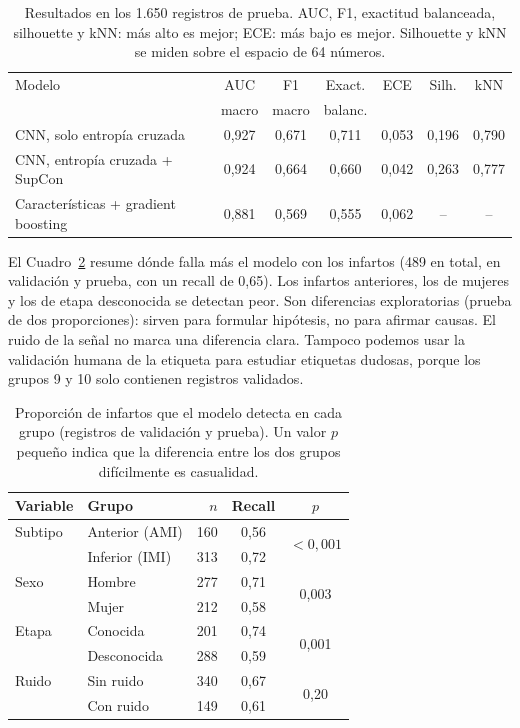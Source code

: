 \documentclass[conference]{IEEEtran}
\begin{document}
\begin{table}[t]
\centering
\caption{Resultados en los 1.650 registros de prueba. AUC, F1, exactitud balanceada, silhouette y kNN: más alto es mejor; ECE: más bajo es mejor. Silhouette y kNN se miden sobre el espacio de 64 números.}
\label{tab:resultados}
\scriptsize
\setlength{\tabcolsep}{3pt}
\begin{tabular}{lcccccc}
\toprule
Modelo & AUC & F1 & Exact. & ECE & Silh. & kNN \\
 & macro & macro & balanc. & & & \\
\midrule
CNN, solo entropía cruzada & 0,927 & 0,671 & 0,711 & 0,053 & 0,196 & 0,790 \\
CNN, entropía cruzada + SupCon & 0,924 & 0,664 & 0,660 & 0,042 & 0,263 & 0,777 \\
Características + gradient boosting & 0,881 & 0,569 & 0,555 & 0,062 & -- & -- \\
\bottomrule
\end{tabular}
\end{table}

El Cuadro~\ref{tab:errores} resume dónde falla más el modelo con los infartos (489 en total, en validación y prueba, con un recall de 0,65). Los infartos anteriores, los de mujeres y los de etapa desconocida se detectan peor. Son diferencias exploratorias (prueba de dos proporciones): sirven para formular hipótesis, no para afirmar causas. El ruido de la señal no marca una diferencia clara. Tampoco podemos usar la validación humana de la etiqueta para estudiar etiquetas dudosas, porque los grupos 9 y 10 solo contienen registros validados.

\begin{table}[t]
\centering
\caption{Proporción de infartos que el modelo detecta en cada grupo (registros de validación y prueba). Un valor $p$ pequeño indica que la diferencia entre los dos grupos difícilmente es casualidad.}
\label{tab:errores}
\small
\begin{tabular}{llrcc}
\toprule
Variable & Grupo & $n$ & Recall & $p$ \\
\midrule
Subtipo & Anterior (AMI) & 160 & 0,56 & \multirow{2}{*}{$<0{,}001$} \\
        & Inferior (IMI) & 313 & 0,72 & \\
Sexo    & Hombre & 277 & 0,71 & \multirow{2}{*}{0,003} \\
        & Mujer  & 212 & 0,58 & \\
Etapa   & Conocida & 201 & 0,74 & \multirow{2}{*}{0,001} \\
        & Desconocida & 288 & 0,59 & \\
Ruido   & Sin ruido & 340 & 0,67 & \multirow{2}{*}{0,20} \\
        & Con ruido & 149 & 0,61 & \\
\bottomrule
\end{tabular}
\end{table}
\end{document}

